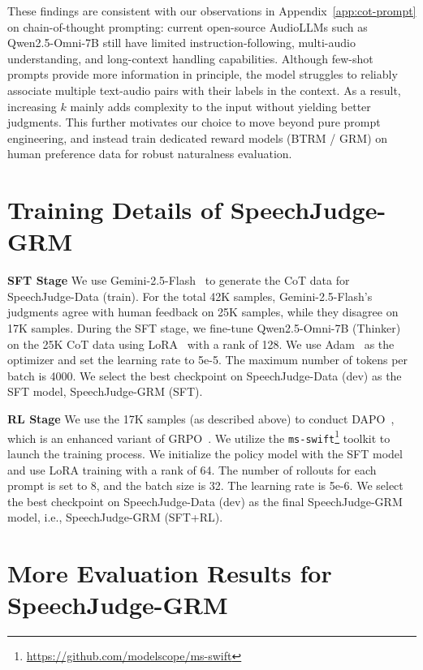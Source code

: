 \documentclass[]{bytedance_seed}
\begin{document}
These findings are consistent with our observations in
Appendix~\ref{app:cot-prompt} on chain-of-thought prompting:
current open-source AudioLLMs such as Qwen2.5-Omni-7B still have limited instruction-following, multi-audio
understanding, and long-context handling capabilities.
Although few-shot prompts provide more information in principle, the model
struggles to reliably associate multiple text-audio pairs with their labels in the context. As a result, increasing $k$ mainly adds complexity to the input without
yielding better judgments.
This further motivates our choice to move beyond pure prompt engineering,
and instead train dedicated reward models (BTRM / GRM) on human preference
data for robust naturalness evaluation.


\section{Training Details of SpeechJudge-GRM}\label{app:expt-setup}
\textbf{SFT Stage}\quad
We use Gemini-2.5-Flash~\citep{gemini2.5} to generate the CoT data for SpeechJudge-Data (train). For the total 42K samples, Gemini-2.5-Flash's judgments agree with human feedback on 25K samples, while they disagree on 17K samples. During the SFT stage, we fine-tune Qwen2.5-Omni-7B (Thinker)~\citep{qwen2.5-omni} on the 25K CoT data using LoRA~\citep{lora} with a rank of 128. We use Adam~\citep{adam,adamw} as the optimizer and set the learning rate to 5e-5. The maximum number of tokens per batch is 4000. We select the best checkpoint on SpeechJudge-Data (dev) as the SFT model, SpeechJudge-GRM (SFT).

\textbf{RL Stage}\quad
We use the 17K samples (as described above) to conduct DAPO~\citep{dapo}, which is an enhanced variant of GRPO~\citep{grpo}. We utilize the \texttt{ms-swift}\footnote{\href{https://github.com/modelscope/ms-swift}{https://github.com/modelscope/ms-swift}} toolkit to launch the training process. We initialize the policy model with the SFT model and use LoRA training with a rank of 64. The number of rollouts for each prompt is set to 8, and the batch size is 32. The learning rate is 5e-6. We select the best checkpoint on SpeechJudge-Data (dev) as the final SpeechJudge-GRM model, i.e., SpeechJudge-GRM (SFT+RL).

    
\section{More Evaluation Results for SpeechJudge-GRM}
\end{document}
